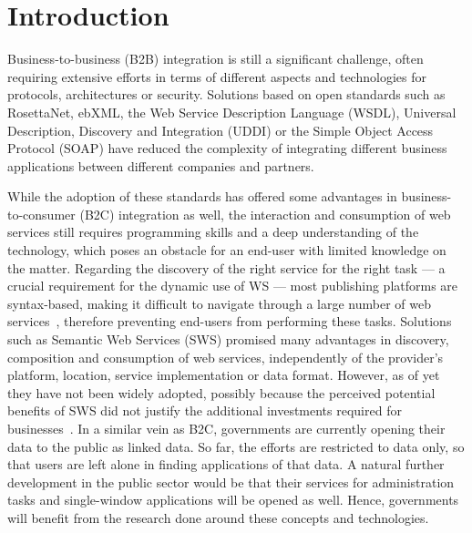 
\section{Introduction}
\label{sec:introduction}

Business-to-business (B2B) integration is still a significant challenge, often requiring extensive efforts in terms of different aspects and technologies for protocols, architectures or security. Solutions based on open standards 
such as RosettaNet, ebXML, the Web Service Description Language (WSDL), Universal Description, Discovery and Integration (UDDI) or the Simple Object Access Protocol (SOAP)
have reduced the complexity of integrating different business applications between different companies and partners. 

While the adoption of these standards has offered some advantages in business-to-consumer (B2C) integration as well,  the interaction and consumption of web services still requires programming skills and a deep understanding of the  technology, which poses an obstacle for an end-user with limited knowledge on the matter.%
Regarding the discovery of the right service for the right task --- a crucial requirement for the dynamic use of WS --- most publishing platforms are syntax-based, %
making it difficult to navigate through a large number of web services~\cite{pilioura_acm2009}, 
therefore preventing end-users from performing these tasks. 
Solutions such as Semantic Web Services (SWS) promised many advantages in discovery, composition and consumption of web services, independently of the provider's platform, location, service implementation or data format. 
However, as of yet they have not been widely adopted, 
possibly because the perceived potential benefits of SWS did not justify the additional investments required for businesses~\cite{shi2007}.
In a similar vein as B2C, governments are currently opening their data to the public as linked data. 
So far, the efforts are restricted to data only, so that users are left alone in finding applications of that data. 
A natural further development in the public sector would be that their services for administration tasks and single-window applications will be opened as well. Hence, governments will benefit from the research done around these concepts and technologies.

